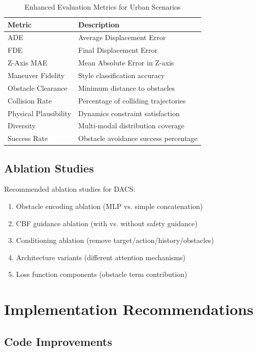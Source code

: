 \documentclass[12pt]{article}
\begin{document}
\begin{table}[h]
\centering
\caption{Enhanced Evaluation Metrics for Urban Scenarios}
\begin{tabular}{ll}
\toprule
\textbf{Metric} & \textbf{Description} \\
\midrule
ADE & Average Displacement Error \\
FDE & Final Displacement Error \\
Z-Axis MAE & Mean Absolute Error in Z-axis \\
Maneuver Fidelity & Style classification accuracy \\
Obstacle Clearance & Minimum distance to obstacles \\
Collision Rate & Percentage of colliding trajectories \\
Physical Plausibility & Dynamics constraint satisfaction \\
Diversity & Multi-modal distribution coverage \\
Success Rate & Obstacle avoidance success percentage \\
\bottomrule
\end{tabular}
\end{table}

\subsection{Ablation Studies}

Recommended ablation studies for DACS:

\begin{enumerate}
    \item Obstacle encoding ablation (MLP vs. simple concatenation)
    \item CBF guidance ablation (with vs. without safety guidance)
    \item Conditioning ablation (remove target/action/history/obstacles)
    \item Architecture variants (different attention mechanisms)
    \item Loss function components (obstacle term contribution)
\end{enumerate}

\section{Implementation Recommendations}

\subsection{Code Improvements}
\end{document}
